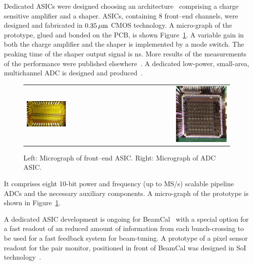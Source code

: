 Dedicated ASICs were designed choosing
an
architecture~\cite{Boie1982365,Gatti:1986qq}
comprising a charge sensitive amplifier and a shaper.
ASICs, containing 8 front--end channels, were designed and fabricated in $\unit[0.35]{\micron}$ CMOS technology.
A micro-graph of the prototype, glued and bonded on the PCB, is shown Figure~\ref{fig:frontend_photo}.
A variable gain in both the charge amplifier and
the shaper is implemented by a mode switch. The peaking time of the shaper output signal is \unit[60]{ns}.
More results of the measurements of the performance were published elsewhere~\cite{4600902}.
A dedicated low-power, small-area, multichannel ADC is designed and produced~\cite{6156491}.
\begin{figure}[hbp]
\begin{center}
 \begin{tabular}{rrr}
    \includegraphics[width=0.4\columnwidth]{Calorimeter/FCAL/figs/fcal_lumical_fe_photo}
     &~~~~~~&
 \includegraphics[width=0.4\textwidth,height=0.28\textwidth]{Calorimeter/FCAL/figs/adc_asic_photo.png} \\

\end{tabular}
   \end{center}
          \caption{Left: Micrograph of front--end ASIC.
               Right: Micrograph of ADC ASIC.}
    \label{fig:frontend_photo}
\end{figure}
It comprises eight 10-bit power and frequency (up to  \unit[24]{MS/s}) scalable pipeline ADCs and the necessary
auxiliary components.
A micro-graph of the prototype is shown in Figure~\ref{fig:frontend_photo}.

A dedicated ASIC development is ongoing for BeamCal~\cite{6200898}
with a special option for a fast readout of an reduced amount of
information from each bunch-crossing to be used for a fast feedback system for beam-tuning.
A prototype of a pixel sensor readout for the pair monitor, positioned in front of BeamCal was designed in SoI
technology~\cite{Sato201153}.

